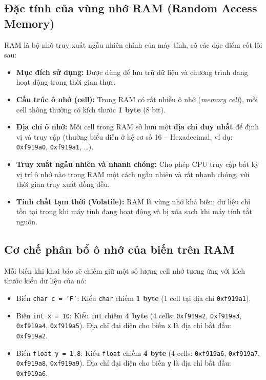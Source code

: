 \documentclass[12pt,a4paper]{article}
\begin{document}
\subsection{Đặc tính của vùng nhớ RAM (Random Access Memory)}
RAM là bộ nhớ truy xuất ngẫu nhiên chính của máy tính, có các đặc điểm cốt lõi sau:
\begin{itemize}[itemsep=0.15em]
    \item \textbf{Mục đích sử dụng:} Được dùng để lưu trữ dữ liệu và chương trình đang hoạt động trong thời gian thực.
    \item \textbf{Cấu trúc ô nhớ (cell):} Trong RAM có rất nhiều ô nhớ (\textit{memory cell}), mỗi cell thông thường có kích thước \textbf{1 byte} (8 bit).
    \item \textbf{Địa chỉ ô nhớ:} Mỗi cell trong RAM sở hữu một \textbf{địa chỉ duy nhất} để định vị và truy cập (thường biểu diễn ở hệ cơ số 16 -- Hexadecimal, ví dụ: \texttt{0xf919a0}, \texttt{0xf919a1}, \dots).
    \item \textbf{Truy xuất ngẫu nhiên và nhanh chóng:} Cho phép CPU truy cập bất kỳ vị trí ô nhớ nào trong RAM một cách ngẫu nhiên và rất nhanh chóng, với thời gian truy xuất đồng đều.
    \item \textbf{Tính chất tạm thời (Volatile):} RAM là vùng nhớ khả biến; dữ liệu chỉ tồn tại trong khi máy tính đang hoạt động và bị xóa sạch khi máy tính tắt nguồn.
\end{itemize}

\subsection{Cơ chế phân bổ ô nhớ của biến trên RAM}
Mỗi biến khi khai báo sẽ chiếm giữ một số lượng cell nhớ tương ứng với kích thước kiểu dữ liệu của nó:
\begin{itemize}[itemsep=0.15em]
    \item Biến \texttt{char c = 'F'}: Kiểu \texttt{char} chiếm \textbf{1 byte} (1 cell tại địa chỉ \texttt{0xf919a1}).
    \item Biến \texttt{int x = 10}: Kiểu \texttt{int} chiếm \textbf{4 byte} (4 cells: \texttt{0xf919a2}, \texttt{0xf919a3}, \texttt{0xf919a4}, \texttt{0xf919a5}). Địa chỉ đại diện cho biến \texttt{x} là địa chỉ bắt đầu: \texttt{0xf919a2}.
    \item Biến \texttt{float y = 1.8}: Kiểu \texttt{float} chiếm \textbf{4 byte} (4 cells: \texttt{0xf919a6}, \texttt{0xf919a7}, \texttt{0xf919a8}, \texttt{0xf919a9}). Địa chỉ đại diện cho biến \texttt{y} là địa chỉ bắt đầu: \texttt{0xf919a6}.
\end{itemize}
\end{document}
